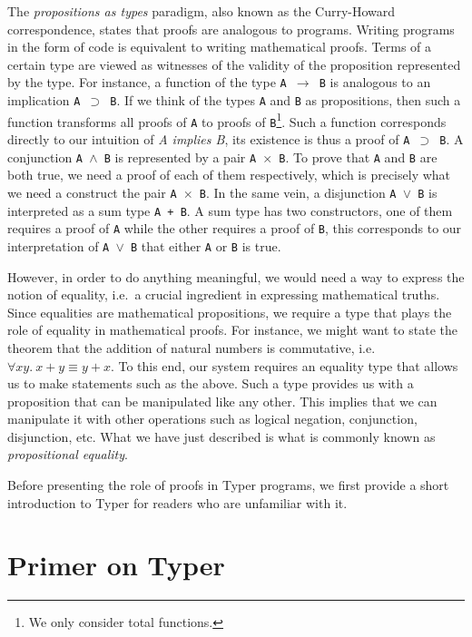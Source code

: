 \documentclass[12pt,twoside,maitrise]{dms}
\theoremstyle{definition}
\numberwithin{equation}{section}
\numberwithin{table}{chapter}
\numberwithin{figure}{chapter}
\newcommand\fn[1] {\texttt{#1}}
\begin{document}
The \emph{propositions as types} paradigm, also known as the Curry-Howard
correspondence, states that proofs are analogous to programs. Writing programs
in the form of code is equivalent to writing mathematical proofs. Terms of a
certain type are viewed as witnesses of the validity of the proposition
represented by the type. For instance, a function of the type \fn{A
  $\rightarrow$ B} is analogous to an implication \fn{A $\supset$ B}. If we
think of the types \fn{A} and \fn{B} as propositions, then such a function
transforms all proofs of \fn{A} to proofs of \fn{B}\footnote{We only consider
total functions.}. Such a function corresponds directly to our intuition of
\emph{A implies B}, its existence is thus a proof of \fn{A $\supset$ B}. A
conjunction \fn{A $\wedge$ B} is represented by a pair \fn{A $\times$ B}. To
prove that \fn{A} and \fn{B} are both true, we need a proof of each of them
respectively, which is precisely what we need a construct the pair \fn{A
  $\times$ B}. In the same vein, a disjunction \fn{A $\vee$ B} is interpreted as
a sum type \fn{A + B}. A sum type has two constructors, one of them requires a
proof of \fn{A} while the other requires a proof of \fn{B}, this corresponds to
our interpretation of \fn{A $\vee$ B} that either \fn{A} or \fn{B} is true.

However, in order to do anything meaningful, we would need a way to express the
notion of equality, i.e.\ a crucial ingredient in expressing mathematical
truths. Since equalities are mathematical propositions, we require a type that
plays the role of equality in mathematical proofs. For instance, we might want
to state the theorem that the addition of natural numbers is commutative, i.e.
$\forall xy. \ x + y \equiv y + x$. To this end, our system requires an equality
type that allows us to make statements such as the above. Such a type provides
us with a proposition that can be manipulated like any other. This implies that
we can manipulate it with other operations such as logical negation,
conjunction, disjunction, etc. What we have just described is what is commonly
known as \emph{propositional equality}.

Before presenting the role of proofs in Typer programs, we first provide a
short introduction to Typer for readers who are unfamiliar with it.

\section{Primer on Typer}\label{sec:intro-typer}
\end{document}
